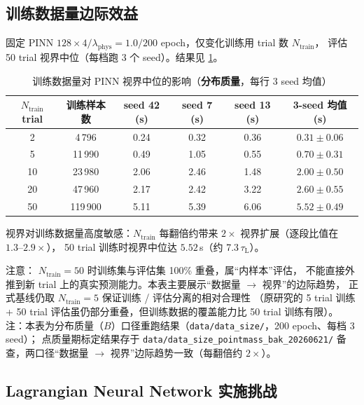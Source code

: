 \documentclass[a4paper,12pt]{ctexart}   %
\newcommand{\tauL}{\tau_{\mathrm{L}}}              %
\renewcommand{\emph}[1]{#1}
\begin{document}
\subsection{训练数据量边际效益}
\label{sec:ablation-data-size}

固定 PINN $128 \times 4 / \lambda_{\mathrm{phys}} = 1.0 / 200$ epoch，仅变化训练用 trial 数 $N_{\mathrm{train}}$，
评估 50 trial 视界中位（每档跑 3 个 seed）。结果见 \cref{tab:ablation-data}。

\begin{table}[h]
\centering
\caption{训练数据量对 PINN 视界中位的影响（\textbf{分布质量}，每行 3 seed 均值）}
\label{tab:ablation-data}
\begin{tabular}{cccccc}
\toprule
$N_{\mathrm{train}}$ trial & 训练样本数 & seed 42 (s) & seed 7 (s) & seed 13 (s) & 3-seed 均值 (s) \\
\midrule
2  & 4\,796   & 0.24 & 0.32 & 0.36 & $0.31 \pm 0.06$ \\
5  & 11\,990  & 0.49 & 1.05 & 0.55 & $0.70 \pm 0.31$ \\
10 & 23\,980  & 2.06 & 2.46 & 1.48 & $2.00 \pm 0.50$ \\
20 & 47\,960  & 2.17 & 2.42 & 3.22 & $2.60 \pm 0.55$ \\
50 & 119\,900 & 5.11 & 5.39 & 6.06 & $5.52 \pm 0.49$ \\
\bottomrule
\end{tabular}
\end{table}

\noindent 视界对训练数据量高度敏感：$N_{\mathrm{train}}$ 每翻倍约带来 $2 \times$ 视界扩展（逐段比值在 $1.3\text{--}2.9\times$），
50 trial 训练时视界中位达 $5.52$\,s（约 7.3\,$\tauL$）。

\emph{注意：} $N_{\mathrm{train}} = 50$ 时训练集与评估集 100\% 重叠，属“内样本”评估，
不能直接外推到新 trial 上的真实预测能力。本表主要展示“数据量 $\to$ 视界”的边际趋势，
正式基线仍取 $N_{\mathrm{train}} = 5$ 保证训练 / 评估分离的相对合理性
（原研究的 5 trial 训练 + 50 trial 评估虽仍部分重叠，但训练数据的覆盖能力比 50 trial 训练有限）。
\emph{注：}本表为分布质量（$B$）口径重跑结果（\texttt{data/data\_size/}，200 epoch、每档 3 seed）；
点质量期标定结果存于 \texttt{data/data\_size\_pointmass\_bak\_20260621/} 备查，两口径“数据量 $\to$ 视界”边际趋势一致（每翻倍约 $2\times$）。

\subsection{Lagrangian Neural Network 实施挑战}
\label{sec:ablation-lnn}
\end{document}
